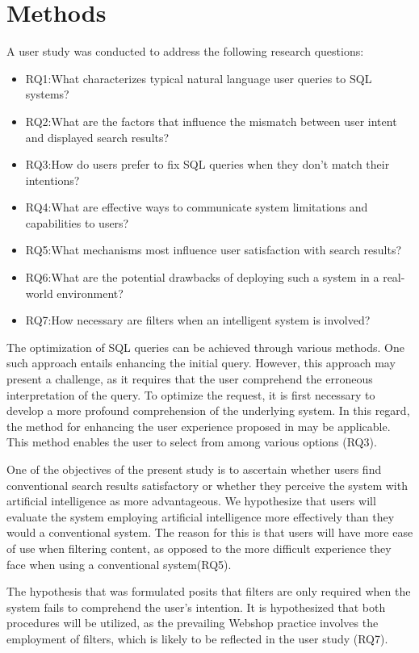 \documentclass[../../submission.tex]{subfiles}
\begin{document}
\section{Methods}
A user study was conducted to address the following research questions:

\begin{itemize}
    \item RQ1:What characterizes typical natural language user queries to SQL systems?
    \item RQ2:What are the factors that influence the mismatch between user intent and displayed search results?
    \item RQ3:How do users prefer to fix SQL queries when they don't match their intentions?
    \item RQ4:What are effective ways to communicate system limitations and capabilities to users?    
    \item RQ5:What mechanisms most influence user satisfaction with search results?
    \item RQ6:What are the potential drawbacks of deploying such a system in a real-world environment?
    \item RQ7:How necessary are filters when an intelligent system is involved?
\end{itemize}
The optimization of SQL queries can be achieved through various methods. 
One such approach entails enhancing the initial query. However, this approach may present a challenge, as it requires that the user comprehend the erroneous interpretation of the query. 
To optimize the request, it is first necessary to develop a more profound comprehension of the underlying system. 
In this regard, the method for enhancing the user experience proposed in \cite{popescuEtalTowardsTheoryOfNaturalLanguage} may be applicable. 
This method enables the user to select from among various options (RQ3).  

One of the objectives of the present study is to ascertain whether users find conventional search results satisfactory or whether they perceive the system 
with artificial intelligence as more advantageous.
We hypothesize that users will evaluate the system employing artificial intelligence more effectively than they would a conventional system.
The reason for this is that users will have more ease of use when filtering content, as opposed to the more difficult experience they face when using a conventional system(RQ5).

The hypothesis that was formulated posits that filters are only required when the system fails to comprehend the user's intention. 
It is hypothesized that both procedures will be utilized, as the prevailing Webshop practice involves the employment of filters, which is likely to be reflected in the user study (RQ7).
\end{document}
